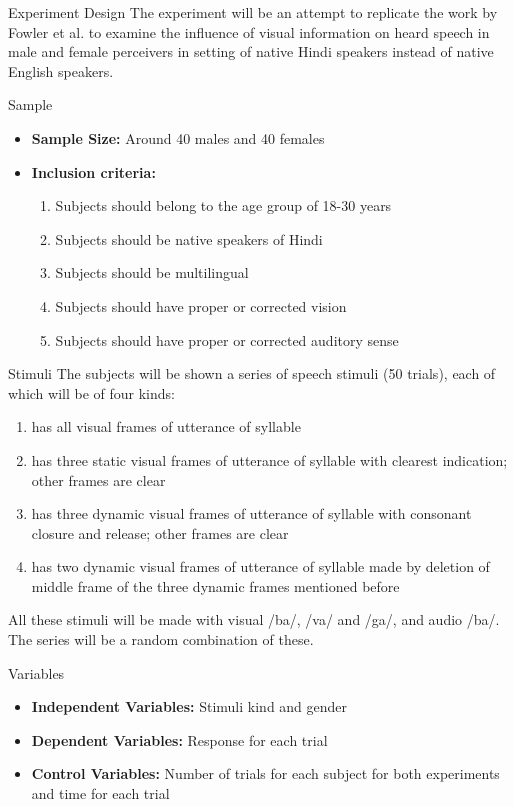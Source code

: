 \documentclass{article}
\begin{document}
\begin{psection}{Experiment Design}
	The experiment will be an attempt to replicate the work by Fowler et al. \cite{sex difference}  to examine the influence of visual information on heard speech in male and female perceivers  in setting of native Hindi speakers instead of native English speakers.
	\begin{psubsection}{Sample}
		\begin{itemize}
			\item \textbf{Sample Size:} Around 40 males and 40 females
			\item \textbf{Inclusion criteria:} 
				\begin{enumerate}
					\item Subjects should belong to the age group of 18-30 years
					\item Subjects should be native speakers of Hindi
					\item Subjects should be multilingual
					\item Subjects should have proper or corrected vision
					\item Subjects should have proper or corrected auditory sense
				\end{enumerate}
		\end{itemize}
	\end{psubsection}

	\begin{psubsection}{Stimuli}
		The subjects will be shown a series of speech stimuli (50 trials), each of which will be of four kinds:
		\begin{enumerate}
			\item has all visual frames of utterance of syllable
			\item has three static visual frames of utterance of syllable with clearest indication; other frames are clear
			\item has three dynamic visual frames of utterance of syllable with consonant closure and release; other frames are clear
			\item has two dynamic visual frames of utterance of syllable made by deletion of middle frame of the three dynamic frames mentioned before
		\end{enumerate}
		All these stimuli will be made with visual /ba/, /va/ and /ga/, and audio /ba/. The series will be a random combination of these.
	\end{psubsection}

	\begin{psubsection}{Variables}
		\begin{itemize}
			\item \textbf{Independent Variables:} Stimuli kind and gender
			\item \textbf{Dependent Variables:} Response for each trial
			\item \textbf{Control Variables:} Number of trials for each subject for both experiments and time for each trial
		\end{itemize}
	\end{psubsection}


\end{psection}
\end{document}
